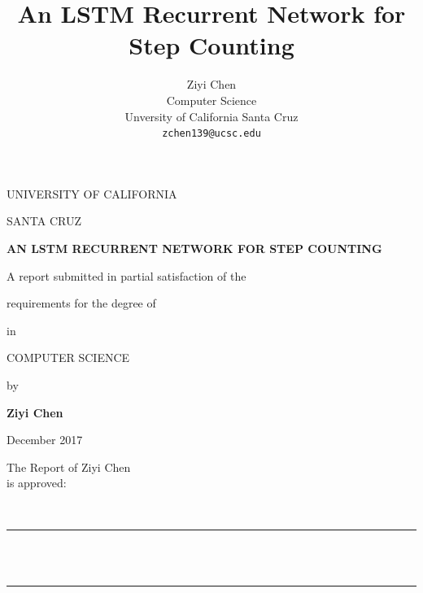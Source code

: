 \documentclass[11pt]{article}
\title{An LSTM Recurrent Network for Step Counting}
\author{Ziyi Chen \\
  Computer Science  \\
  Unversity of California Santa Cruz\\
  {\tt zchen139@ucsc.edu}}
\date{}
\begin{document}
\onecolumn

{
    {\setcounter{page}{0}}
  
  \enlargethispage{\footskip}

  \begin{center}
  \Large
    UNIVERSITY OF CALIFORNIA \par
    \smallskip
    {\expandafter\uppercase\expandafter{SANTA CRUZ}} \par
    \bigskip
    {\bfseries {\expandafter\uppercase\expandafter{An LSTM Recurrent Network for Step Counting}} \par}
    \medskip
    A report submitted in partial satisfaction of the \par
    requirements for the degree of \par
    \bigskip
    {\expandafter{}} \par
    \bigskip
    in \par
    \bigskip
    {\expandafter\uppercase\expandafter{COMPUTER SCIENCE}} \par
    \bigskip
    by \par
    \bigskip
    {\bfseries Ziyi Chen} \par
    \bigskip
    December 2017 \par
  \end{center}

\vfill
\begin{center}
\Large
\hfill \parbox{3in}{The Report of {Ziyi Chen}\\ is approved:} \\
\bigskip \bigskip \medskip
\hfill\rule{2.6in}{0.5pt}\\
\hfill{}\\
\bigskip \medskip
\hfill\rule{2.6in}{0.5pt}\\
\hfill{}\\
\bigskip \smallskip
\end{center}



\maketitle
\begin{abstract}


\end{abstract}}
\end{document}
